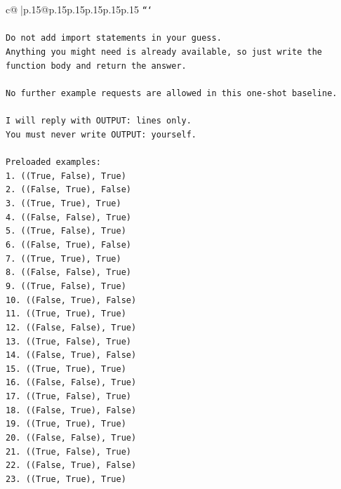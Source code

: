 \documentclass{article}
\begin{document}
{\begin{supertabular}{c@{$\;$}|p{.15\linewidth}@{}p{.15\linewidth}p{.15\linewidth}p{.15\linewidth}p{.15\linewidth}p{.15\linewidth}}
{{{\texttt{```} \\
\\ 
\texttt{Do not add import statements in your guess.} \\
\texttt{Anything you might need is already available, so just write the function body and return the answer.} \\
\\ 
\texttt{No further example requests are allowed in this one{-}shot baseline.} \\
\\ 
\texttt{I will reply with OUTPUT: lines only.} \\
\texttt{You must never write OUTPUT: yourself.} \\
\\ 
\texttt{Preloaded examples:} \\
\texttt{1. ((True, False), True)} \\
\texttt{2. ((False, True), False)} \\
\texttt{3. ((True, True), True)} \\
\texttt{4. ((False, False), True)} \\
\texttt{5. ((True, False), True)} \\
\texttt{6. ((False, True), False)} \\
\texttt{7. ((True, True), True)} \\
\texttt{8. ((False, False), True)} \\
\texttt{9. ((True, False), True)} \\
\texttt{10. ((False, True), False)} \\
\texttt{11. ((True, True), True)} \\
\texttt{12. ((False, False), True)} \\
\texttt{13. ((True, False), True)} \\
\texttt{14. ((False, True), False)} \\
\texttt{15. ((True, True), True)} \\
\texttt{16. ((False, False), True)} \\
\texttt{17. ((True, False), True)} \\
\texttt{18. ((False, True), False)} \\
\texttt{19. ((True, True), True)} \\
\texttt{20. ((False, False), True)} \\
\texttt{21. ((True, False), True)} \\
\texttt{22. ((False, True), False)} \\
\texttt{23. ((True, True), True)} \\
}}}
\end{supertabular}}
\end{document}
